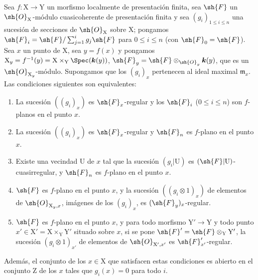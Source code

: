 \begin{theorem}[11.3.8]
\label{IV.11.3.8}
Sea $f:\mathrm{X}\to\mathrm{Y}$ un morfismo localmente de presentación finita, sea $\sh{F}$ un $\sh{O}_\mathrm{X}$-módulo cuasicoherente de presentación finita y sea $(g_i)_{1\leqslant i\leqslant n}$ una sucesión de secciones de $\sh{O}_\mathrm{X}$ sobre $\mathrm{X}$; pongamos $\sh{F}_i=\sh{F}/\sum_{j=1}^{i}g_j\sh{F}$ para $0\leqslant i\leqslant n$ (con $\sh{F}_0=\sh{F}$). Sea $x$ un punto de $\mathrm{X}$, sea $y=f(x)$ y pongamos $\mathrm{X}_y=f^{-1}(y)=\mathrm{X}\times_\mathrm{Y}\Spec(\boldsymbol{k}(y))$, $\sh{F}_y=\sh{F}\otimes_{\sh{O}_y}\boldsymbol{k}(y)$, que es un $\sh{O}_{\mathrm{X}_y}$-módulo. Supongamos que los $(g_i)_x$ pertenecen al ideal maximal $\mathfrak{m}_x$. Las condiciones siguientes son equivalentes:
\begin{enumerate}[label=\emph{\alph*)}]
  \item La sucesión $((g_i)_x)$ es $\sh{F}_x$-regular y los $\sh{F}_i$ ($0\leqslant i\leqslant n$) son $f$-planos en el punto $x$.
  \item La sucesión $((g_i)_x)$ es $\sh{F}_x$-regular y $\sh{F}_n$ es $f$-plano en el punto $x$.
  \item[\emph{b$'$)}] Existe una vecindad $\mathrm{U}$ de $x$ tal que la sucesión $(g_i|\mathrm{U})$ es $(\sh{F}|\mathrm{U})$-cuasirregular, y $\sh{F}_n$ es $f$-plano en el punto $x$.
  \item $\sh{F}$ es $f$-plano en el punto $x$, y la sucesión $((g_i\otimes 1)_x)$ de elementos de $\sh{O}_{\mathrm{X}_y,x}$, imágenes de los $(g_i)_x$, es $(\sh{F}_y)_x$-regular.
  \item $\sh{F}$ es $f$-plano en el punto $x$, y para todo morfismo $\mathrm{Y}'\to\mathrm{Y}$ y todo punto $x'\in\mathrm{X}'=\mathrm{X}\times_\mathrm{Y}\mathrm{Y}'$ situado sobre $x$, si se pone $\sh{F}'=\sh{F}\otimes_\mathrm{Y}\mathrm{Y}'$, la sucesión $(g_i\otimes 1)_{x'}$ de elementos de $\sh{O}_{\mathrm{X}',x'}$ es $\sh{F}'_{x'}$-regular.
\end{enumerate}
Además, el conjunto de los $x\in\mathrm{X}$ que satisfacen estas condiciones es abierto en el conjunto $\mathrm{Z}$ de los $x$ tales que $g_i(x)=0$ para todo $i$.
\end{theorem}

